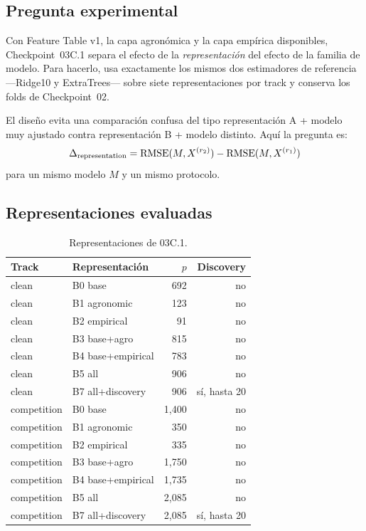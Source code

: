 \subsection{Pregunta experimental}

Con Feature Table v1, la capa agronómica y la capa empírica disponibles, Checkpoint~03C.1
separa el efecto de la \emph{representación} del efecto de la familia de modelo. Para hacerlo,
usa exactamente los mismos dos estimadores de referencia ---Ridge10 y ExtraTrees--- sobre
siete representaciones por track y conserva los folds de Checkpoint~02.

El diseño evita una comparación confusa del tipo representación A + modelo muy ajustado contra
representación B + modelo distinto. Aquí la pregunta es:
\[
\Delta_{\mathrm{representation}}
=
\operatorname{RMSE}(M,X^{(r_2)})-\operatorname{RMSE}(M,X^{(r_1)})
\]
para un mismo modelo $M$ y un mismo protocolo.

\subsection{Representaciones evaluadas}

\begin{table}[H]
\centering
\caption{Representaciones de 03C.1.}
\label{tab:cp03c1-reps}
\small
\begin{tabular}{llrr}
\toprule
Track & Representación & $p$ & Discovery \\
\midrule
clean & B0 base & 692 & no \\
clean & B1 agronomic & 123 & no \\
clean & B2 empirical & 91 & no \\
clean & B3 base+agro & 815 & no \\
clean & B4 base+empirical & 783 & no \\
clean & B5 all & 906 & no \\
clean & B7 all+discovery & 906 & sí, hasta 20 \\
\midrule
competition & B0 base & 1,400 & no \\
competition & B1 agronomic & 350 & no \\
competition & B2 empirical & 335 & no \\
competition & B3 base+agro & 1,750 & no \\
competition & B4 base+empirical & 1,735 & no \\
competition & B5 all & 2,085 & no \\
competition & B7 all+discovery & 2,085 & sí, hasta 20 \\
\bottomrule
\end{tabular}
\end{table}

